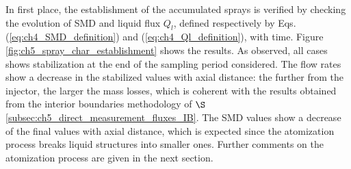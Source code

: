 In first place, the establishment of the accumulated sprays is verified by checking the evolution of SMD and liquid flux $Q_l$, defined respectively by Eqs. (\ref{eq:ch4_SMD_definition}) and (\ref{eq:ch4_Ql_definition}), with time. Figure \ref{fig:ch5_spray_char_establishment} shows the results. As observed, all cases shows stabilization at the end of the sampling period considered. The flow rates show a decrease in the stabilized values with axial distance: the further from the injector, the larger the mass losses, which is coherent with the results obtained from the interior boundaries methodology of $\S$\ref{subsec:ch5_direct_measurement_fluxes_IB}. The SMD values show a decrease of the final values with axial distance, which is expected since the atomization process breaks liquid structures into smaller ones. Further comments on the atomization process are given in the next section. %


